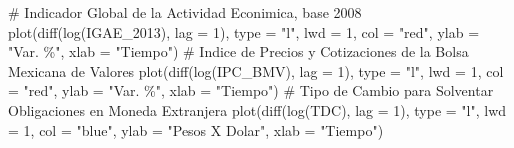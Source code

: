\documentclass[
  a4paper,
]{article}
\newenvironment{Shaded}{}{}
\newcommand{\AttributeTok}[1]{\textcolor[rgb]{0.84,0.23,0.29}{#1}}
\newcommand{\CommentTok}[1]{\textcolor[rgb]{0.42,0.45,0.49}{#1}}
\newcommand{\DecValTok}[1]{\textcolor[rgb]{0.00,0.36,0.77}{#1}}
\newcommand{\FunctionTok}[1]{\textcolor[rgb]{0.44,0.26,0.76}{#1}}
\newcommand{\NormalTok}[1]{\textcolor[rgb]{0.14,0.16,0.18}{#1}}
\newcommand{\StringTok}[1]{\textcolor[rgb]{0.01,0.18,0.38}{#1}}
\begin{document}
\begin{Shaded}
\begin{Highlighting}[]
\CommentTok{\# Indicador Global de la Actividad Econimica, base 2008}
\FunctionTok{plot}\NormalTok{(}\FunctionTok{diff}\NormalTok{(}\FunctionTok{log}\NormalTok{(IGAE\_2013), }\AttributeTok{lag =} \DecValTok{1}\NormalTok{), }\AttributeTok{type =} \StringTok{"l"}\NormalTok{, }\AttributeTok{lwd =} \DecValTok{1}\NormalTok{, }\AttributeTok{col =} \StringTok{"red"}\NormalTok{, }\AttributeTok{ylab =} \StringTok{"Var. \%"}\NormalTok{, }\AttributeTok{xlab =} \StringTok{"Tiempo"}\NormalTok{)}
\CommentTok{\# Indice de Precios y Cotizaciones de la Bolsa Mexicana de Valores}
\FunctionTok{plot}\NormalTok{(}\FunctionTok{diff}\NormalTok{(}\FunctionTok{log}\NormalTok{(IPC\_BMV), }\AttributeTok{lag =} \DecValTok{1}\NormalTok{), }\AttributeTok{type =} \StringTok{"l"}\NormalTok{, }\AttributeTok{lwd =} \DecValTok{1}\NormalTok{, }\AttributeTok{col =} \StringTok{"red"}\NormalTok{, }\AttributeTok{ylab =} \StringTok{"Var. \%"}\NormalTok{, }\AttributeTok{xlab =} \StringTok{"Tiempo"}\NormalTok{)}
\CommentTok{\# Tipo de Cambio para Solventar Obligaciones en Moneda Extranjera}
\FunctionTok{plot}\NormalTok{(}\FunctionTok{diff}\NormalTok{(}\FunctionTok{log}\NormalTok{(TDC), }\AttributeTok{lag =} \DecValTok{1}\NormalTok{), }\AttributeTok{type =} \StringTok{"l"}\NormalTok{, }\AttributeTok{lwd =} \DecValTok{1}\NormalTok{, }\AttributeTok{col =} \StringTok{"blue"}\NormalTok{, }\AttributeTok{ylab =} \StringTok{"Pesos X Dolar"}\NormalTok{, }\AttributeTok{xlab =} \StringTok{"Tiempo"}\NormalTok{)}
\end{Highlighting}
\end{Shaded}
\end{document}
